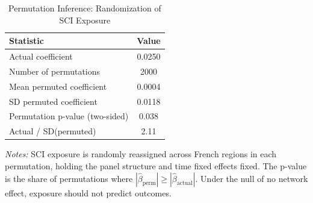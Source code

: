\begin{table}[htbp]
\centering
\caption{Permutation Inference: Randomization of SCI Exposure}
\label{tab:permutation}
\begin{tabular}{lc}
\toprule
Statistic & Value \\
\midrule
Actual coefficient & 0.0250 \\
Number of permutations & 2000 \\
Mean permuted coefficient & 0.0004 \\
SD permuted coefficient & 0.0118 \\
Permutation p-value (two-sided) & 0.038 \\
Actual / SD(permuted) & 2.11 \\
\bottomrule
\end{tabular}
\begin{minipage}{0.9\textwidth}
\footnotesize \textit{Notes:} SCI exposure is randomly reassigned across French regions in each permutation, holding the panel structure and time fixed effects fixed. The p-value is the share of permutations where $|\hat{\beta}_{\text{perm}}| \geq |\hat{\beta}_{\text{actual}}|$. Under the null of no network effect, exposure should not predict outcomes.
\end{minipage}
\end{table}
